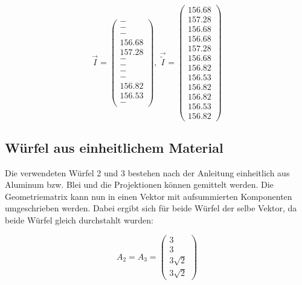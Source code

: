 \begin{equation*}
  \vec{I}=\begin{pmatrix}
        - \\
        - \\
        - \\
        156.68  \\
        157.28  \\
        - \\
        - \\
        - \\
        - \\
        156.82 \\
        156.53 \\
        -
  \end{pmatrix},\
  \vec{\tilde{I}}=\begin{pmatrix}
        156.68 \\
        157.28 \\
        156.68 \\
        156.68 \\
        157.28 \\
        156.68 \\
        156.82 \\
        156.53 \\
        156.82 \\
        156.82 \\
        156.53 \\
        156.82
  \end{pmatrix}
\end{equation*}


\subsection{Würfel aus einheitlichem Material}
Die verwendeten Würfel 2 und 3 bestehen nach der Anleitung einheitlich aus Aluminum bzw.
Blei und die Projektionen können gemittelt werden. Die Geometriematrix kann nun in einen
Vektor mit aufsummierten Komponenten umgeschrieben werden. Dabei ergibt sich für beide
Würfel der selbe Vektor, da beide Würfel gleich durchstahlt wurden:

\begin{equation*}
  A_2 = A_3 = \begin{pmatrix}
          3 \\
          3 \\
          3\sqrt{2} \\
          3\sqrt{2}
        \end{pmatrix}
\end{equation*}

